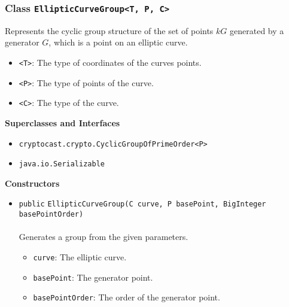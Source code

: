 \subsubsection{Class \lstinline|EllipticCurveGroup<T, P, C>|}
Represents the cyclic group structure of the set of points $kG$ generated
 by a generator $G$, which is a point on an elliptic curve. \\
\noindent\begin{minipage}[t]{5cm}
\vspace{0.3em}
\hspace*{2em}
\vspace{0.3em}
\end{minipage}

\begin{itemize}
\item \lstinline|<T>|: The type of coordinates of the curves points.
\item \lstinline|<P>|: The type of points of the curve.
\item \lstinline|<C>|: The type of the curve.
\end{itemize}


\textbf{\sffamily Superclasses and Interfaces}
\begin{itemize}
\item \lstinline|cryptocast.crypto.CyclicGroupOfPrimeOrder<P>|
\item \lstinline|java.io.Serializable|
\end{itemize}


\textbf{\sffamily Constructors}
\begin{itemize}
\item \lstinline|public| \lstinline|EllipticCurveGroup|\lstinline|(C curve, P basePoint, BigInteger basePointOrder)|\\ \\[-0.6em]
Generates a group from the given parameters.
\begin{itemize}
\item \lstinline|curve|: The elliptic curve.
\item \lstinline|basePoint|: The generator point.
\item \lstinline|basePointOrder|: The order of the generator point.
\end{itemize}



\end{itemize}


